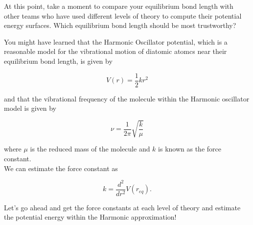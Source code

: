 \documentclass[11pt]{article}
\begin{document}
    At this point, take a moment to compare your equilibrium bond length
with other teams who have used different levels of theory to compute
their potential energy surfaces. Which equilibrium bond length should be
most trustworthy?

You might have learned that the Harmonic Oscillator potential, which is
a reasonable model for the vibrational motion of diatomic atomcs near
their equilibrium bond length, is given by

\begin{equation}
V(r) = \frac{1}{2} k r^2
\end{equation}

and that the vibrational frequency of the molecule within the Harmonic
oscillator model is given by

\begin{equation}
\nu = \frac{1}{2\pi}\sqrt{\frac{k}{\mu}}
\end{equation}

where \(\mu\) is the reduced mass of the molecule and \(k\) is known as
the force constant.\\
We can estimate the force constant as

\begin{equation}
k = \frac{d^2}{dr^2} V(r_{eq}).
\end{equation}

Let's go ahead and get the force constants at each level of theory and
estimate the potential energy within the Harmonic approximation!
\end{document}
